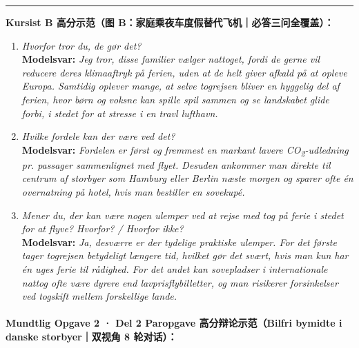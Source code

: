 \begin{answerbox}
\vspace{0.3em}
\hrule
\vspace{0.3em}
\textbf{\color{NCDNavy}Kursist B 高分示范（图 B：家庭乘夜车度假替代飞机｜必答三问全覆盖）：}
\begin{enumerate}[leftmargin=1.5em, itemsep=0.2em]
  \item \textit{Hvorfor tror du, de gør det?}\\
  \textbf{Modelsvar:} \textit{Jeg tror, disse familier vælger nattoget, fordi de gerne vil reducere deres klimaaftryk  på ferien, uden at de helt giver afkald på at opleve Europa. Samtidig oplever mange, at selve togrejsen bliver en hyggelig del af ferien, hvor børn og voksne kan spille spil sammen og se landskabet glide forbi, i stedet for at stresse i en travl lufthavn.}
  \item \textit{Hvilke fordele kan der være ved det?}\\
  \textbf{Modelsvar:} \textit{Fordelen er først og fremmest en markant lavere CO\textsubscript{2}-udledning pr. passager sammenlignet med flyet. Desuden ankommer man direkte til centrum af storbyer som Hamburg eller Berlin næste morgen og sparer ofte én overnatning på hotel, hvis man bestiller en sovekupé.}
  \item \textit{Mener du, der kan være nogen ulemper ved at rejse med tog på ferie i stedet for at flyve? Hvorfor? / Hvorfor ikke?}\\
  \textbf{Modelsvar:} \textit{Ja, desværre er der tydelige praktiske ulemper. For det første tager togrejsen betydeligt længere tid, hvilket gør det svært, hvis man kun har én uges ferie til rådighed. For det andet kan sovepladser i internationale nattog ofte være dyrere end lavprisflybilletter, og man risikerer forsinkelser ved togskift mellem forskellige lande.}
\end{enumerate}
\end{answerbox}

\vspace{0.15em}
\paragraph*{Mundtlig Opgave 2 · Del 2 Paropgave 高分辩论示范（Bilfri bymidte i danske storbyer｜双视角 8 轮对话）：}

